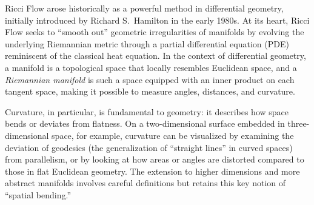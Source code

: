 Ricci Flow arose historically as a powerful method in differential geometry, initially introduced by Richard S.~Hamilton in the early 1980s. At its heart, Ricci Flow seeks to ``smooth out'' geometric irregularities of manifolds by evolving the underlying Riemannian metric through a partial differential equation (PDE) reminiscent of the classical heat equation. In the context of differential geometry, a manifold is a topological space that locally resembles Euclidean space, and a \emph{Riemannian manifold} is such a space equipped with an inner product on each tangent space, making it possible to measure angles, distances, and curvature. 

Curvature, in particular, is fundamental to geometry: it describes how space bends or deviates from flatness. On a two-dimensional surface embedded in three-dimensional space, for example, curvature can be visualized by examining the deviation of geodesics (the generalization of ``straight lines'' in curved spaces) from parallelism, or by looking at how areas or angles are distorted compared to those in flat Euclidean geometry. The extension to higher dimensions and more abstract manifolds involves careful definitions but retains this key notion of ``spatial bending.'' 


